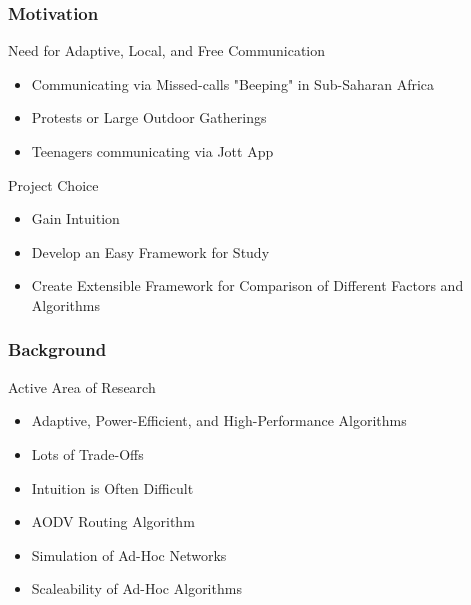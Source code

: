 
\subtitle{\class}

\newcommand{\listheading}[1]{%
    {\Large #1}
}


\begin{frame}
    \titlepage
\end{frame}

\begin{frame}
    \frametitle{Motivation}
    \listheading{Need for Adaptive, Local, and Free Communication}
    \begin{itemize}
        \item Communicating via Missed-calls "Beeping" in Sub-Saharan Africa \cite{beeping}
        \item Protests or Large Outdoor Gatherings
        \item Teenagers communicating via Jott App \cite{jott-techcrunch,jott-forbes}\\[0.5cm]
    \end{itemize}
    
    \listheading{Project Choice}
    \begin{itemize}
        \item Gain Intuition
        \item Develop an Easy Framework for Study
        \item Create Extensible Framework for Comparison of Different Factors and Algorithms
    \end{itemize}

\end{frame}

\begin{frame}
    \frametitle{Background}
    \listheading{Active Area of Research}
    \begin{itemize}
        \item Adaptive, Power-Efficient, and High-Performance Algorithms
        \item Lots of Trade-Offs
        \item Intuition is Often Difficult
        \item AODV Routing Algorithm \cite{perkins99,royer00}
        \item Simulation of Ad-Hoc Networks \cite{morshed08}
        \item Scaleability of Ad-Hoc Algorithms \cite{lee01}
    \end{itemize}

\end{frame}

